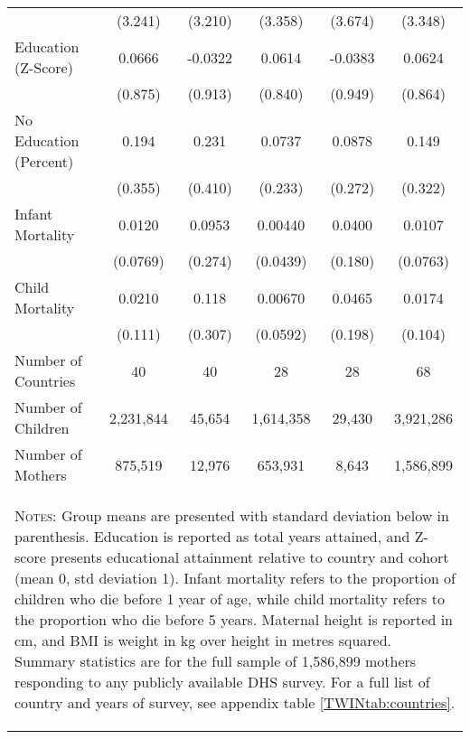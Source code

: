 \begin{table}[htpb!]
\begin{center}
{\begin{tabular}{lccccc}
&(3.241)&(3.210)&(3.358)&(3.674)&(3.348)\\
Education (Z-Score)&0.0666&-0.0322&0.0614&-0.0383&0.0624\\
&(0.875)&(0.913)&(0.840)&(0.949)&(0.864)\\
No Education (Percent)&0.194&0.231&0.0737&0.0878&0.149\\
&(0.355)&(0.410)&(0.233)&(0.272)&(0.322)\\
Infant Mortality&0.0120&0.0953&0.00440&0.0400&0.0107\\
&(0.0769)&(0.274)&(0.0439)&(0.180)&(0.0763)\\
Child Mortality&0.0210&0.118&0.00670&0.0465&0.0174\\
&(0.111)&(0.307)&(0.0592)&(0.198)&(0.104)\\
\midrule
Number of Countries & 40&40  & 28&28  & 68 \\
Number of Children &2,231,844 &45,654 &1,614,358 &29,430 & 3,921,286 \\
Number of Mothers &875,519 &12,976 &653,931 &8,643 & 1,586,899 \\
\midrule
\multicolumn{6}{p{13.2cm}}{\begin{footnotesize}\textsc{Notes:}  Group means are presented with standard deviation below in parenthesis.  Education is reported as total years attained, and Z-score presents educational attainment relative to country and cohort (mean 0, std deviation 1).  Infant mortality refers to the proportion of children who die before 1 year of age,  while child mortality refers to the proportion who die before 5 years.  Maternal height is reported in cm, and BMI is weight in kg over height in metres squared.  Summary statistics are for the full sample of 1,586,899 mothers responding to any publicly available DHS survey.  For a full list of country and years of survey, see appendix table \ref{TWINtab:countries}.\end{footnotesize}} \\ \bottomrule \end{tabular}}\end{center}\end{table}
